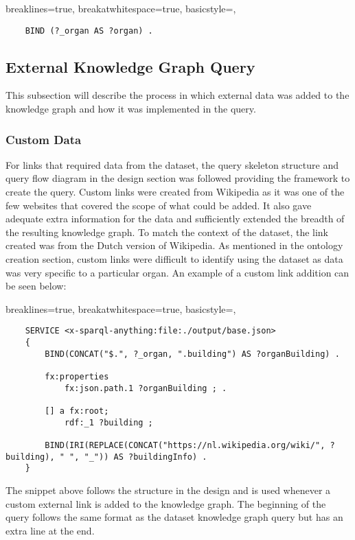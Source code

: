 \lstset
{
    breaklines=true,
    breakatwhitespace=true,
    basicstyle=\ttfamily,
}
\begin{lstlisting}
    BIND (?_organ AS ?organ) .
\end{lstlisting}

\subsection{External Knowledge Graph Query}
\hspace*{0.5cm} This subsection will describe the process in which external data was added to the knowledge graph and how it was implemented in the query. 

\subsubsection{Custom Data}
\hspace*{0.5cm} For links that required data from the dataset, the query skeleton structure and query flow diagram in the design section was followed providing the framework to create the query. Custom links were created from Wikipedia as it was one of the few websites that covered the scope of what could be added. It also gave adequate extra information for the data and sufficiently extended the breadth of the resulting knowledge graph. To match the context of the dataset, the link created was from the Dutch version of Wikipedia. As mentioned in the ontology creation section, custom links were difficult to identify using the dataset as data was very specific to a particular organ. An example of a custom link addition can be seen below:

\lstset
{
    breaklines=true,
    breakatwhitespace=true,
    basicstyle=\ttfamily,
}
\begin{lstlisting}
    SERVICE <x-sparql-anything:file:./output/base.json>
    {
        BIND(CONCAT("$.", ?_organ, ".building") AS ?organBuilding) .
    
        fx:properties
            fx:json.path.1 ?organBuilding ; .
    
        [] a fx:root; 
            rdf:_1 ?building ;
    
        BIND(IRI(REPLACE(CONCAT("https://nl.wikipedia.org/wiki/", ?building), " ", "_")) AS ?buildingInfo) . 
    } 
\end{lstlisting}

The snippet above follows the structure in the design and is used whenever a custom external link is added to the knowledge graph. The beginning of the query follows the same format as the dataset knowledge graph query but has an extra line at the end.

